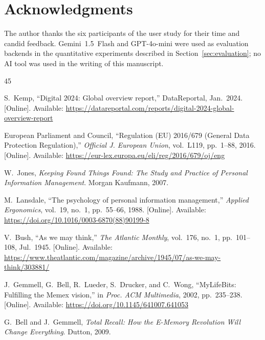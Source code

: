 \documentclass[conference]{IEEEtran}
\begin{document}
\section*{Acknowledgments}
The author thanks the six participants of the user study for their time and candid feedback. Gemini~1.5~Flash and GPT-4o-mini were used as evaluation backends in the quantitative experiments described in Section~\ref{sec:evaluation}; no AI tool was used in the writing of this manuscript.

\begin{thebibliography}{45}

S.~Kemp, ``Digital 2024: Global overview report,'' DataReportal, Jan.~2024. [Online]. Available: \url{https://datareportal.com/reports/digital-2024-global-overview-report}

European Parliament and Council, ``Regulation (EU) 2016/679 (General Data Protection Regulation),'' \emph{Official J. European Union}, vol.~L119, pp.~1--88, 2016. [Online]. Available: \url{https://eur-lex.europa.eu/eli/reg/2016/679/oj/eng}

W.~Jones, \emph{Keeping Found Things Found: The Study and Practice of Personal Information Management}. Morgan Kaufmann, 2007.

M.~Lansdale, ``The psychology of personal information management,'' \emph{Applied Ergonomics}, vol.~19, no.~1, pp.~55--66, 1988. [Online]. Available: \url{https://doi.org/10.1016/0003-6870(88)90199-8}

V.~Bush, ``As we may think,'' \emph{The Atlantic Monthly}, vol.~176, no.~1, pp.~101--108, Jul.~1945. [Online]. Available: \url{https://www.theatlantic.com/magazine/archive/1945/07/as-we-may-think/303881/}

J.~Gemmell, G.~Bell, R.~Lueder, S.~Drucker, and C.~Wong, ``MyLifeBits: Fulfilling the Memex vision,'' in \emph{Proc. ACM Multimedia}, 2002, pp.~235--238. [Online]. Available: \url{https://doi.org/10.1145/641007.641053}

G.~Bell and J.~Gemmell, \emph{Total Recall: How the E-Memory Revolution Will Change Everything}. Dutton, 2009.


\end{thebibliography}
\end{document}

